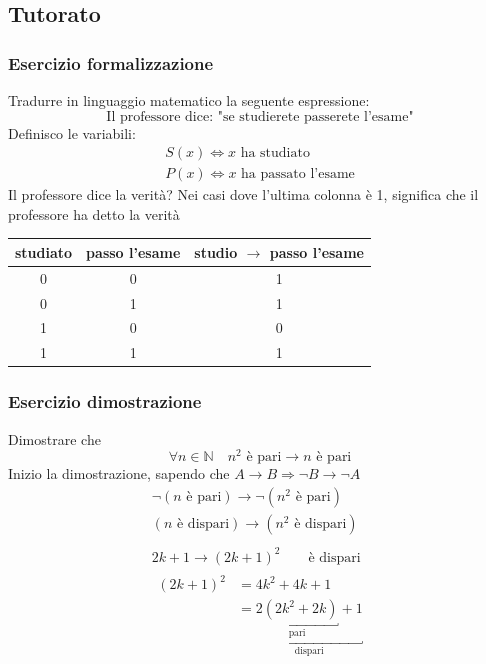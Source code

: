 \documentclass[italian]{article}
\begin{document}
\newpage
\subsection{Tutorato}
\subsubsection{Esercizio formalizzazione}
Tradurre in linguaggio matematico la seguente espressione:
\[
	\text{Il professore dice: "se studierete passerete l'esame"}
\]
Definisco le variabili:
\begin{gather*}
	S(x) \Leftrightarrow x \text{ ha studiato} \\
	P(x) \Leftrightarrow x \text{ ha passato l'esame}
\end{gather*}
Il professore dice la verità? Nei casi dove l'ultima colonna è 1, significa che il professore ha detto la verità
\begin{table}[h]
	\centering
	\begin{tabular}{|c|c|c|}
		\hline
		\textbf{studiato} & \textbf{passo l'esame} & \textbf{studio} $\to$ \textbf{passo l'esame} \\ \hline
		0 & 0 & 1 \\ \hline
		0 & 1 & 1 \\ \hline
		1 & 0 & 0 \\ \hline
		1 & 1 & 1 \\ \hline
	\end{tabular}
\end{table}

\subsubsection{Esercizio dimostrazione}
Dimostrare che
\[
	\forall n \in \mathbb{N} \quad n^2 \text{ è pari} \to n \text{ è pari}
\]
Inizio la dimostrazione, sapendo che $A\to B \Rightarrow \lnot B \to \lnot A$
\begin{gather*}
	\lnot(n \text{ è pari}) \to \lnot(n^2 \text{ è pari}) \\
	(n \text{ è dispari}) \to (n^2 \text{ è dispari}) \\\\
	2k+1 \to (2k+1)^2 \qquad \text{è dispari}\\
	\begin{split}
		(2k+1)^2 &= 4k^2 + 4k + 1 \\
		&= \underbracket{\underbracket{2(2k^2+2k)}_{\text{pari}} + 1}_{\text{dispari}}
	\end{split}
\end{gather*}
\end{document}
